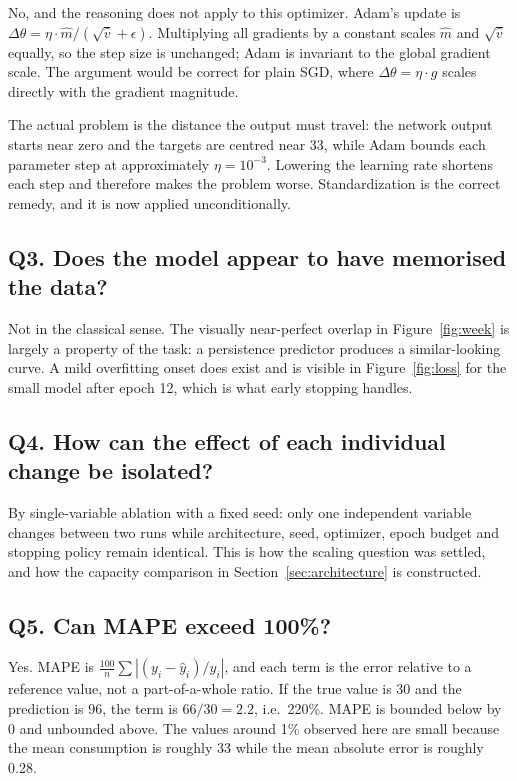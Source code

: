 \documentclass[11pt,a4paper]{article}
\begin{document}
No, and the reasoning does not apply to this optimizer. Adam's update is
$\Delta\theta = \eta \cdot \hat{m} / (\sqrt{\hat{v}} + \epsilon)$. Multiplying all gradients by a
constant scales $\hat{m}$ and $\sqrt{\hat{v}}$ equally, so the step size is unchanged; Adam is
invariant to the global gradient scale. The argument would be correct for plain SGD, where
$\Delta\theta = \eta \cdot g$ scales directly with the gradient magnitude.

The actual problem is the distance the output must travel: the network output starts near zero and
the targets are centred near 33, while Adam bounds each parameter step at approximately
$\eta = 10^{-3}$. Lowering the learning rate shortens each step and therefore makes the problem
worse. Standardization is the correct remedy, and it is now applied unconditionally.

\subsection*{Q3. Does the model appear to have memorised the data?}

Not in the classical sense. The visually near-perfect overlap in Figure~\ref{fig:week} is largely a
property of the task: a persistence predictor produces a similar-looking curve. A mild overfitting
onset does exist and is visible in Figure~\ref{fig:loss} for the small model after epoch 12, which
is what early stopping handles.

\subsection*{Q4. How can the effect of each individual change be isolated?}

By single-variable ablation with a fixed seed: only one independent variable changes between two
runs while architecture, seed, optimizer, epoch budget and stopping policy remain identical. This
is how the scaling question was settled, and how the capacity comparison in
Section~\ref{sec:architecture} is constructed.

\subsection*{Q5. Can MAPE exceed 100\%?}

Yes. MAPE is $\frac{100}{n}\sum |(y_i - \hat{y}_i)/y_i|$, and each term is the error relative to a
reference value, not a part-of-a-whole ratio. If the true value is 30 and the prediction is 96, the
term is $66/30 = 2.2$, i.e.\ 220\%. MAPE is bounded below by 0 and unbounded above. The values
around 1\% observed here are small because the mean consumption is roughly 33 while the mean
absolute error is roughly 0.28.
\end{document}
